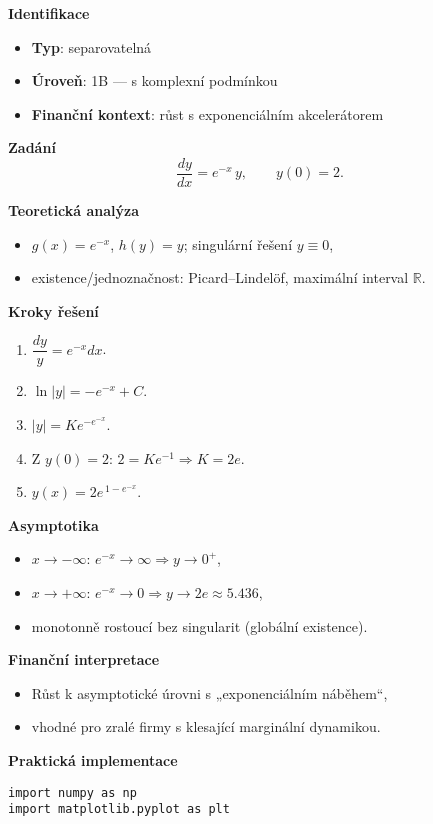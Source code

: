 \begin{example}
\label{ex:1b2}

\textbf{Identifikace}
\begin{itemize}
\item \textbf{Typ}: separovatelná
\item \textbf{Úroveň}: 1B — s komplexní podmínkou
\item \textbf{Finanční kontext}: růst s exponenciálním akcelerátorem
\end{itemize}

\textbf{Zadání}
\[
\frac{dy}{dx} = e^{-x}\,y, \qquad y(0) = 2.
\]

\textbf{Teoretická analýza}
\begin{itemize}
\item $g(x)=e^{-x}$, $h(y)=y$; singulární řešení $y\equiv 0$,
\item existence/jednoznačnost: Picard–Lindelöf, maximální interval $\mathbb{R}$.
\end{itemize}

\textbf{Kroky řešení}
\begin{enumerate}
\item $\dfrac{dy}{y}=e^{-x}dx$.
\item $\ln|y| = -e^{-x} + C$.
\item $|y| = K e^{-e^{-x}}$.
\item Z $y(0)=2$: $2=K e^{-1} \Rightarrow K=2e$.
\item $\displaystyle y(x)=2e^{\,1 - e^{-x}}$.
\end{enumerate}

\textbf{Asymptotika}
\begin{itemize}
\item $x\to -\infty$: $e^{-x}\to \infty \Rightarrow y\to 0^+$,
\item $x\to +\infty$: $e^{-x}\to 0 \Rightarrow y\to 2e\approx 5.436$,
\item monotonně rostoucí bez singularit (globální existence).
\end{itemize}

\textbf{Finanční interpretace}
\begin{itemize}
\item Růst k asymptotické úrovni s „exponenciálním náběhem“,
\item vhodné pro zralé firmy s klesající marginální dynamikou.
\end{itemize}

\textbf{Praktická implementace}
\begin{verbatim}
import numpy as np
import matplotlib.pyplot as plt


\end{verbatim}
\end{example}
